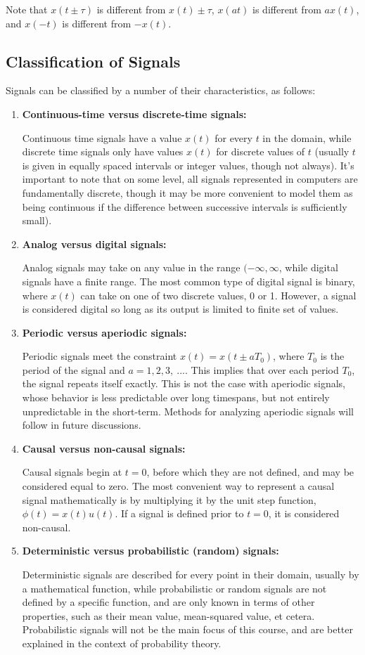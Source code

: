 \documentclass{article}
\begin{document}
Note that \(x(t\pm \tau)\) is different from \(x(t)\pm \tau\), \(x(at)\) is different from \(ax(t)\), and \(x(-t)\) is different from \(-x(t)\).

\subsection{Classification of Signals}
Signals can be classified by a number of their characteristics, as follows:  
\begin{enumerate}
	\item \textbf{Continuous-time versus discrete-time signals:}

		Continuous time signals have a value \(x(t)\) for every \(t\) in the domain, while discrete time signals only have values \(x(t)\) for discrete values of \(t\) (usually \(t\) is given in equally spaced intervals or integer values, though not always). It's important to note that on some level, all signals represented in computers are fundamentally discrete, though it may be more convenient to model them as being continuous if the difference between successive intervals is sufficiently small). 

	\item \textbf{Analog versus digital signals:}
		
		Analog signals may take on any value in the range \((-\infty, \infty\), while digital signals have a finite range. The most common type of digital signal is binary, where \(x(t)\) can take on one of two discrete values, 0 or 1. However, a signal is considered digital so long as its output is limited to finite set of values.  

	\item \textbf{Periodic versus aperiodic signals:}

		Periodic signals meet the constraint \(x(t) = x(t\pm aT_0)\), where \(T_0\) is the period of the signal and \(a = 1, 2, 3, \ ...\).  This implies that over each period \(T_0\), the signal repeats itself exactly. This is not the case with aperiodic signals, whose behavior is less predictable over long timespans, but not entirely unpredictable in the short-term. Methods for analyzing aperiodic signals will follow in future discussions. 
	\item \textbf{Causal versus non-causal signals:}

		Causal signals begin at \(t=0\), before which they are not defined, and may be considered equal to zero. The most convenient way to represent a causal signal mathematically is by multiplying it by the unit step function, \(\phi(t) = x(t)u(t)\). If a signal is defined prior to \(t=0\), it is considered non-causal. 
	\item \textbf{Deterministic versus probabilistic (random) signals:}

			Deterministic signals are described for every point in their domain, usually by a mathematical function, while probabilistic or random signals are not defined by a specific function, and are only known in terms of other properties, such as their mean value, mean-squared value, et cetera. Probabilistic signals will not be the main focus of this course, and are better explained in the context of probability theory.
\end{enumerate}
\end{document}
